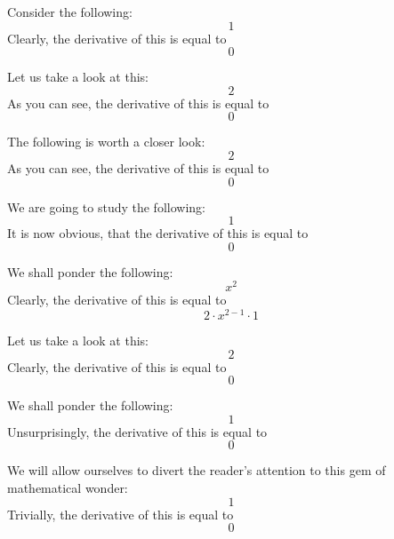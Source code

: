 \documentclass{article}
\begin{document}
Consider the following:
\begin{equation}
1 
\end{equation}
Clearly, the derivative of this is equal to
\begin{equation}
0 
\end{equation}

Let us take a look at this:
\begin{equation}
2 
\end{equation}
As you can see, the derivative of this is equal to
\begin{equation}
0 
\end{equation}

The following is worth a closer look:
\begin{equation}
2 
\end{equation}
As you can see, the derivative of this is equal to
\begin{equation}
0 
\end{equation}

We are going to study the following:
\begin{equation}
1 
\end{equation}
It is now obvious, that the derivative of this is equal to
\begin{equation}
0 
\end{equation}

We shall ponder the following:
\begin{equation}
x ^{2 } 
\end{equation}
Clearly, the derivative of this is equal to
\begin{equation}
2 \cdot x ^{2 - 1 } \cdot 1 
\end{equation}

Let us take a look at this:
\begin{equation}
2 
\end{equation}
Clearly, the derivative of this is equal to
\begin{equation}
0 
\end{equation}

We shall ponder the following:
\begin{equation}
1 
\end{equation}
Unsurprisingly, the derivative of this is equal to
\begin{equation}
0 
\end{equation}

We will allow ourselves to divert the reader's attention to this gem of mathematical wonder:
\begin{equation}
1 
\end{equation}
Trivially, the derivative of this is equal to
\begin{equation}
0 
\end{equation}
\end{document}
